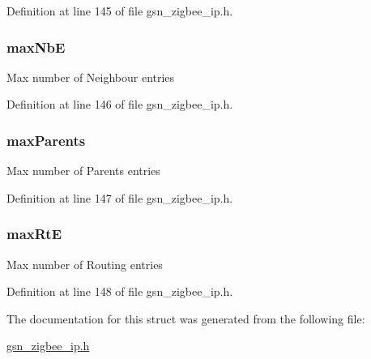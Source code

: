 Definition at line 145 of file gsn\_\-zigbee\_\-ip.h.

\hypertarget{a00439_aa73cd58c7ca4193dbe7db30eadec7f36}{
\subsubsection[{maxNbE}]{ {\bf maxNbE}}}
\label{a00439_aa73cd58c7ca4193dbe7db30eadec7f36}
Max number of Neighbour entries 

Definition at line 146 of file gsn\_\-zigbee\_\-ip.h.

\hypertarget{a00439_a217c1178e6237268b2ebafe5ce2fbd50}{
\subsubsection[{maxParents}]{ {\bf maxParents}}}
\label{a00439_a217c1178e6237268b2ebafe5ce2fbd50}
Max number of Parents entries 

Definition at line 147 of file gsn\_\-zigbee\_\-ip.h.

\hypertarget{a00439_a17ffd82e8cd233649b9a6a7f3477ebf9}{
\subsubsection[{maxRtE}]{ {\bf maxRtE}}}
\label{a00439_a17ffd82e8cd233649b9a6a7f3477ebf9}
Max number of Routing entries 

Definition at line 148 of file gsn\_\-zigbee\_\-ip.h.



The documentation for this struct was generated from the following file:\begin{DoxyCompactItemize}
\item 
\hyperlink{a00618}{gsn\_\-zigbee\_\-ip.h}\end{DoxyCompactItemize}
